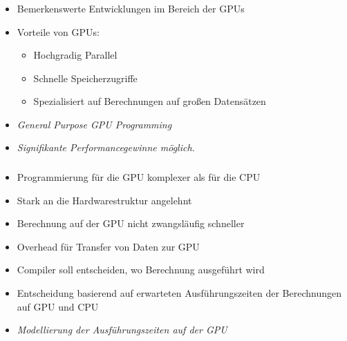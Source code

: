 \documentclass{beamer}
\begin{document}
\begin{frame}
	\frametitle{}
	\begin{itemize}
		\item Bemerkenswerte Entwicklungen im Bereich der GPUs
		\item Vorteile von GPUs:
		\begin{itemize}
			\item Hochgradig Parallel
			\item Schnelle Speicherzugriffe
			\item Spezialisiert auf Berechnungen auf großen Datensätzen
		\end{itemize}
		\pause
		\item \emph{General Purpose GPU Programming}
		\item \emph{Signifikante Performancegewinne möglich.}
	\end{itemize}
\end{frame}

\begin{frame}
	\frametitle{}
	\begin{itemize}
		\item Programmierung für die GPU komplexer als für die CPU
		\item Stark an die Hardwarestruktur angelehnt
		\pause
		\item Berechnung auf der GPU nicht zwangsläufig schneller
		\item Overhead für Transfer von Daten zur GPU
		\pause
		\item Compiler soll entscheiden, wo Berechnung ausgeführt wird
		\item Entscheidung basierend auf erwarteten Ausführungszeiten der Berechnungen auf GPU und CPU
		\pause
		\item \emph{Modellierung der Ausführungszeiten auf der GPU}
	\end{itemize}
\end{frame}

\begin{frame}
	\frametitle{}
	\begin{figure}[h]
		\begin{center}
		\end{center}
	\end{figure}
\end{frame}
\end{document}

